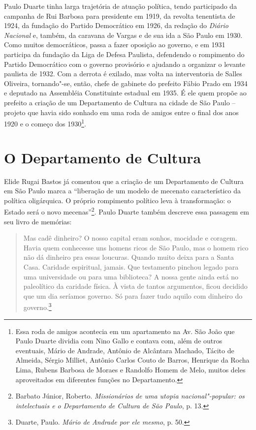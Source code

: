 Paulo Duarte tinha larga trajetória de atuação política, tendo
participado da campanha de Rui Barbosa para presidente em 1919, da
revolta tenentista de 1924, da fundação do Partido Democrático em 1926,
da redação do \emph{Diário Nacional} e, também, da caravana de Vargas e
de sua ida a São Paulo em 1930. Como muitos democráticos, passa a fazer
oposição ao governo, e em 1931 participa da fundação da Liga de Defesa
Paulista, defendendo o rompimento do Partido Democrático com o governo
provisório e ajudando a organizar o levante paulista de 1932. Com a
derrota é exilado, mas volta na interventoria de Salles Oliveira,
tornando"-se, então, chefe de gabinete do prefeito Fábio Prado em 1934 e
deputado na Assembléia Constituinte estadual em 1935. É ele quem propõe
ao prefeito a criação de um Departamento de Cultura na cidade de São
Paulo -- projeto que havia sido sonhado em uma roda de amigos entre o
final dos anos 1920 e o começo dos 1930\footnote{Essa roda de amigos
  acontecia em um apartamento na Av. São João que Paulo Duarte dividia
  com Nino Gallo e contava com, além de outros eventuais, Mário de
  Andrade, Antônio de Alcântara Machado, Tácito de Almeida, Sérgio
  Milliet, Antônio Carlos Couto de Barros, Henrique da Rocha Lima,
  Rubens Barbosa de Moraes e Randolfo Homem de Melo, muitos deles
  aproveitados em diferentes funções no Departamento.}.

\section{O Departamento de Cultura}

Elide Rugai Bastos já comentou que a criação de um Departamento de
Cultura em São Paulo marca a ``liberação de um modelo de mecenato
característico da política oligárquica. O próprio rompimento político
leva à transformação: o Estado será o novo mecenas''\footnote{Barbato
  Júnior, Roberto. \emph{Missionários de uma utopia nacional"-popular: os
  intelectuais e o Departamento de Cultura de São Paulo}, p. 13.}. Paulo
Duarte também descreve essa passagem em seu livro de memórias:

\begin{quote}
Mas cadê dinheiro? O nosso capital eram sonhos, mocidade e coragem.
Havia quem conhecesse uns homens ricos de São Paulo, mas o homem rico
não dá dinheiro pra essas loucuras. Quando muito deixa para a Santa
Casa. Caridade espiritual, jamais. Que testamento pinchou legado para
uma universidade ou para uma biblioteca? A nossa gente ainda está no
paleolítico da caridade física. À vista de tantos argumentos, ficou
decidido que um dia seríamos governo. Só para fazer tudo aquilo com
dinheiro do governo.\footnote{Duarte, Paulo. \emph{Mário de Andrade por
  ele mesmo}, p. 50.}
\end{quote}

